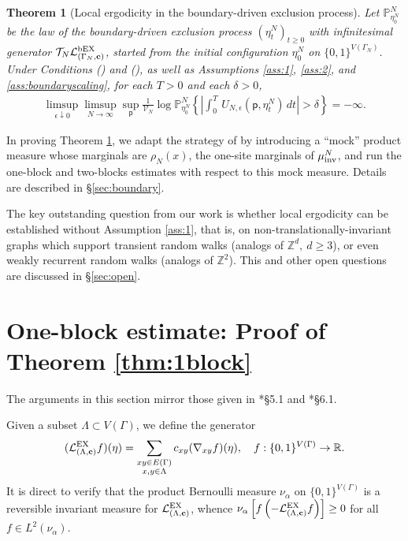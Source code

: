 \documentclass[11pt]{amsart}
\theoremstyle{plain}
\newtheorem{theorem}{Theorem}
\theoremstyle{definition}
\theoremstyle{remark}
\begin{document}
\begin{theorem}[Local ergodicity in the boundary-driven exclusion process]
\label{thm:localergodicboundary}
Let $\mathbb{P}^N_{\eta_0^N}$ be the law of the boundary-driven exclusion process $(\eta_t^N)_{t\geq 0}$ with infinitesimal generator $\mathcal{T}_N \mathcal{L}^{\rm bEX}_{(\Gamma_N, {\bf c})}$, started from the initial configuration $\eta_0^N$ on $\{0,1\}^{V(\Gamma_N)}$. Under Conditions () and (), as well as Assumptions \ref{ass:1}, \ref{ass:2}, and \ref{ass:boundaryscaling},
 for each $T>0$ and each $\delta>0$,
\begin{align}
\label{supexpboundary}
\limsup_{\epsilon\downarrow 0} \limsup_{N\to\infty} \sup_{\mathsf{p}} \frac{1}{\mathcal{V}_N} \log \mathbb{P}^N_{\eta_0^N} \left\{ \left|\int_0^T\, U_{N,\epsilon}({\mathsf{p}},\eta^N_t)\,dt\right|>\delta\right\} = -\infty.
\end{align}
\end{theorem}

In proving Theorem \ref{thm:localergodicboundary}, we adapt the strategy of \cite{BDGJL03} by introducing a ``mock'' product measure whose marginals are $\rho_N(x)$, the one-site marginals of $\mu_{\rm inv}^N$, and run the one-block and two-blocks estimates with respect to this mock measure. Details are described in \S\ref{sec:boundary}.

The key outstanding question from our work is whether local ergodicity can be established without Assumption \ref{ass:1}, that is, on non-translationally-invariant graphs which support transient random walks (analogs of $\mathbb{Z}^d,~d\geq 3$), or even weakly recurrent random walks (analogs of $\mathbb{Z}^2$). This and other open questions are discussed in \S\ref{sec:open}. 

\section{One-block estimate: Proof of Theorem \ref{thm:1block}} \label{sec:1block}

The arguments in this section mirror those given in \cite{Jara}*{\S 5.1} and \cite{JLSLocal}*{\S 6.1}.

Given a subset $\Lambda \subset V(\Gamma)$, we define the generator
\begin{align}
(\mathcal{L}^{\rm EX}_{(\Lambda,{\bf c})} f)(\eta) = \sum_{\substack{xy\in E(\Gamma) \\ x,y \in \Lambda}} c_{xy} (\nabla_{xy} f)(\eta), \quad f: \{0,1\}^{V(\Gamma)} \to\mathbb{R}. 
\end{align}
It is direct to verify that the product Bernoulli measure $\nu_\alpha$ on $\{0,1\}^{V(\Gamma)}$ is a reversible invariant measure for $\mathcal{L}^{\rm EX}_{(\Lambda,{\bf c})}$, whence $\nu_\alpha\left[f \left( -\mathcal{L}^{\rm EX}_{(\Lambda,{\bf c})} f\right)\right] \geq 0$ for all $f\in L^2(\nu_\alpha)$. 
\end{document}

